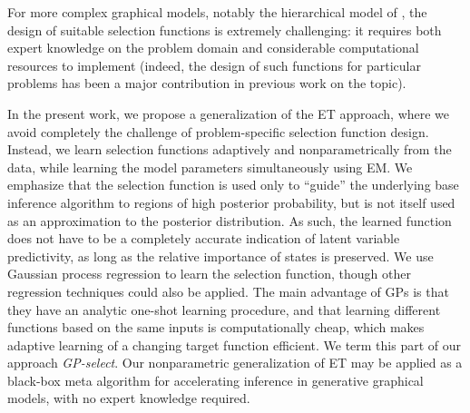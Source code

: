 For more complex graphical models, notably the hierarchical model of \citep{DaiLucke2014},  the design of suitable selection functions
is extremely challenging: it requires both expert knowledge
on the problem domain and considerable computational resources to implement
 (indeed, the design of such functions for  particular problems
has been a major contribution in previous work on the topic).


In the present work, we propose a generalization of the ET approach, where
we avoid completely the challenge of problem-specific selection function design.
Instead,
we learn selection functions  adaptively and nonparametrically
from the data,
 while learning the model
parameters  simultaneously using EM.
We emphasize that the selection function is  used only to ``guide'' the underlying
base inference algorithm to regions of high posterior probability, but is not itself
used as an approximation to the posterior distribution. As such, the learned
function does not have to be a completely accurate indication of latent
variable predictivity,
as long as the relative importance of states is preserved.
We use  Gaussian process
regression \citep{RasmussenGPbook} to learn the selection function, though other regression techniques could
also be applied. The main advantage of GPs
is that they have an analytic one-shot learning procedure, and that learning different
functions based on the same inputs is computationally cheap, which makes adaptive learning
of a changing target function efficient. We term this part of our approach
\textit{GP-select}.
Our nonparametric generalization of  ET may be applied as a black-box
meta algorithm for accelerating inference in  generative graphical models,
with no expert knowledge required.






